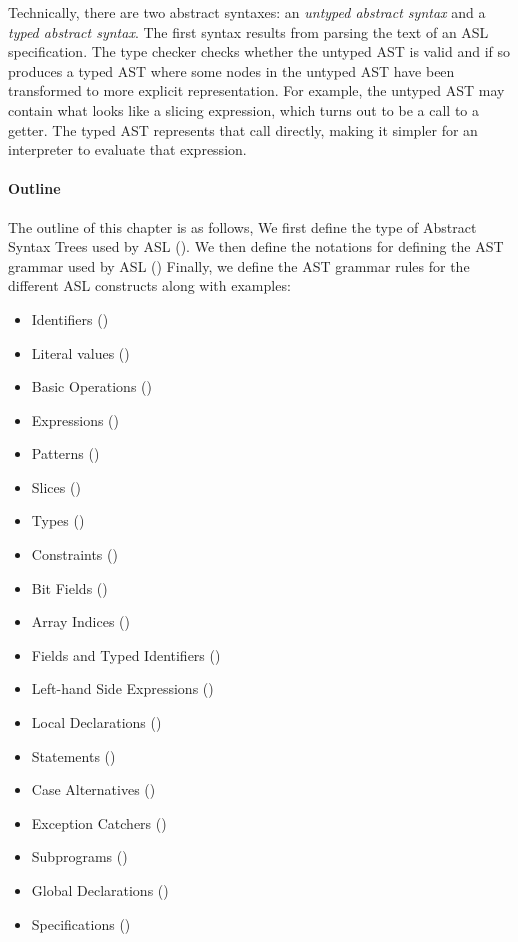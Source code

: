 Technically, there are two abstract syntaxes:
an \emph{untyped abstract syntax} and a \emph{typed abstract syntax}.
The first syntax results from parsing the text of an ASL specification.
The type checker checks whether the untyped AST is valid and if so produces
a typed AST where some nodes in the untyped AST have been transformed to
more explicit representation. For example, the untyped AST may contain
what looks like a slicing expression, which turns out to be a call to a getter.
The typed AST represents that call directly, making it simpler for an interpreter
to evaluate that expression.

\paragraph{Outline}
The outline of this chapter is as follows,
We first define the type of Abstract Syntax Trees used by ASL ().
We then define the notations for defining the AST grammar used by ASL ()
Finally, we define the AST grammar rules for the different ASL constructs along with examples:
\begin{itemize}
  \item Identifiers ()
  \item Literal values ()
  \item Basic Operations ()
  \item Expressions ()
  \item Patterns ()
  \item Slices ()
  \item Types ()
  \item Constraints ()
  \item Bit Fields ()
  \item Array Indices ()
  \item Fields and Typed Identifiers ()
  \item Left-hand Side Expressions ()
  \item Local Declarations ()
  \item Statements ()
  \item Case Alternatives ()
  \item Exception Catchers ()
  \item Subprograms ()
  \item Global Declarations ()
  \item Specifications ()
\end{itemize}

